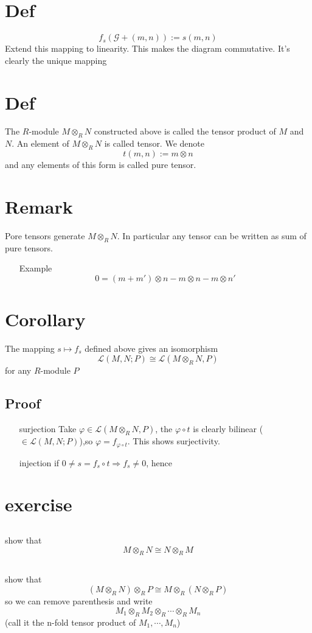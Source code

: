 \documentclass{book}
\begin{document}
\section{Def}
$$f_s(\mathcal{G}+(m,n)):=s(m,n)$$
Extend this mapping to linearity. This makes the diagram commutative. It's clearly the unique mapping
\section{Def}
The $R$-module $M\otimes_RN$ constructed above is called the tensor product of $M$ and $N$. An element of $M\otimes_RN$ is called tensor. We denote$$t(m,n):=m\otimes n$$ and any elements of this form is called pure tensor. 
\section{Remark}Pore tensors generate $M\otimes_R N$. In particular any tensor can be written as sum of pure tensors.
\begin{itemize}
    \item[Example] $$0=(m+m')\otimes n-m\otimes n-m\otimes n'$$
\end{itemize}
\section{Corollary}
The mapping $s\mapsto f_s$ defined above gives an isomorphism
$$\mathscr{L}(M,N;P)\cong \mathscr{L}(M\otimes_RN,P)$$
for any $R$-module $P$
\subsection*{Proof}
\begin{itemize}
    \item[surjection]Take $\varphi\in \mathscr{L}(M\otimes_RN,P)$, the $\varphi\circ t$ is clearly bilinear ($\in\mathscr{L}(M,N;P)$),so $\varphi=f_{\varphi\circ t}$. This shows surjectivity.
    \item[injection]if $0\neq s=f_s\circ t\Rightarrow f_s\neq0$, hence 
\end{itemize}
\section{exercise}
\subsection{}show that $$M\otimes_RN\cong N\otimes_RM$$
\subsection{}show that $$(M\otimes_RN)\otimes_RP\cong M\otimes_R(N\otimes_RP)$$
so we can remove parenthesis and write
$$M_1\otimes_RM_2\otimes_R\cdots\otimes_RM_n$$
(call it the n-fold tensor product of $M_1,\cdots,M_n$)
\end{document}

